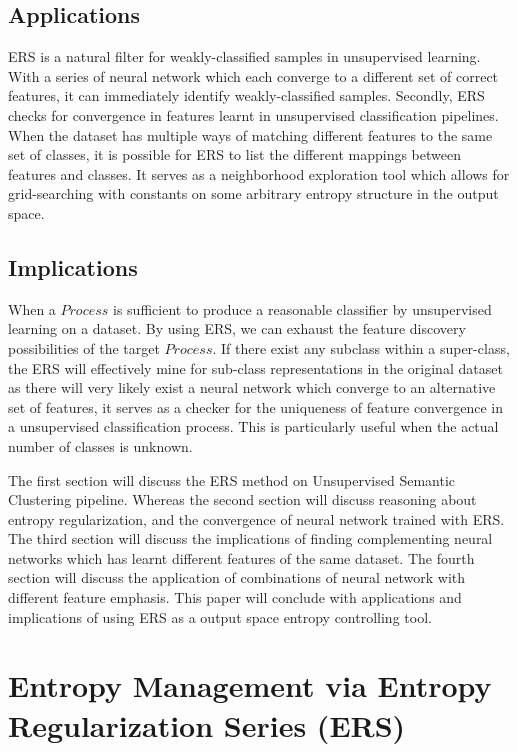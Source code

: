 \documentclass[10pt,twocolumn,letterpaper]{article}
\begin{document}
\subsection{Applications} ERS is a natural filter for weakly-classified samples in unsupervised learning. With a series of neural network which each converge to a different set of correct features, it can immediately identify weakly-classified samples. Secondly, ERS checks for convergence in features learnt in unsupervised classification pipelines. When the dataset has multiple ways of matching different features to the same set of classes, it is possible for ERS to list the different mappings between features and classes. It serves as a neighborhood exploration tool which allows for grid-searching with constants on some arbitrary entropy structure in the output space. 

\subsection{Implications} When a  $Process$ is sufficient to produce a reasonable classifier by unsupervised learning on a dataset. By using ERS, we can exhaust the feature discovery possibilities of the target $Process$. If there exist any subclass within a super-class, the ERS will effectively mine for sub-class representations in the original dataset as there will very likely exist a neural network which converge to an alternative set of features, it serves as a checker for the uniqueness of feature convergence in a unsupervised classification process. This is particularly useful when the actual number of classes is unknown. 


The first section will discuss the ERS method on Unsupervised Semantic Clustering pipeline. Whereas the second section will discuss reasoning about entropy regularization, and the convergence of neural network trained with ERS. The third section will discuss the implications of finding complementing neural networks which has learnt different features of the same dataset. The fourth section will discuss the application of combinations of neural network with different feature emphasis. This paper will conclude with applications and implications of using ERS as a output space entropy controlling tool. 

\section{Entropy Management via Entropy Regularization Series (ERS) }
\end{document}
